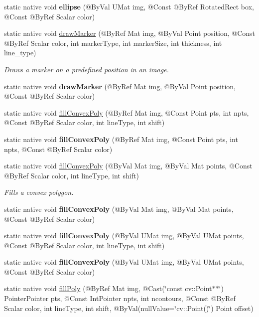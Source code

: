 \begin{DoxyCompactItemize}
\item 
static native void {\bfseries ellipse} (@By\+Val U\+Mat img, @Const @By\+Ref Rotated\+Rect box, @Const @By\+Ref Scalar color)
\item 
static native void \hyperlink{group__imgproc__draw_gaedc7348c70c6b2c486689107ee346af3}{draw\+Marker} (@By\+Ref Mat img, @By\+Val Point position, @Const @By\+Ref Scalar color, int marker\+Type, int marker\+Size, int thickness, int line\+\_\+type)
\begin{DoxyCompactList}\small\item\em Draws a marker on a predefined position in an image. \end{DoxyCompactList}\item 
static native void {\bfseries draw\+Marker} (@By\+Ref Mat img, @By\+Val Point position, @Const @By\+Ref Scalar color)
\item 
static native void \hyperlink{group__imgproc__draw_ga825cdf4013e0a71e60022826a5d47037}{fill\+Convex\+Poly} (@By\+Ref Mat img, @Const Point pts, int npts, @Const @By\+Ref Scalar color, int line\+Type, int shift)
\item 
static native void {\bfseries fill\+Convex\+Poly} (@By\+Ref Mat img, @Const Point pts, int npts, @Const @By\+Ref Scalar color)
\item 
static native void \hyperlink{group__imgproc__draw_gadde734279c0c012260b7bf8a33f44fff}{fill\+Convex\+Poly} (@By\+Val Mat img, @By\+Val Mat points, @Const @By\+Ref Scalar color, int line\+Type, int shift)
\begin{DoxyCompactList}\small\item\em Fills a convex polygon. \end{DoxyCompactList}\item 
static native void {\bfseries fill\+Convex\+Poly} (@By\+Val Mat img, @By\+Val Mat points, @Const @By\+Ref Scalar color)
\item 
static native void {\bfseries fill\+Convex\+Poly} (@By\+Val U\+Mat img, @By\+Val U\+Mat points, @Const @By\+Ref Scalar color, int line\+Type, int shift)
\item 
static native void {\bfseries fill\+Convex\+Poly} (@By\+Val U\+Mat img, @By\+Val U\+Mat points, @Const @By\+Ref Scalar color)
\item 
static native void \hyperlink{group__imgproc__draw_ga885773572ec9b1e9c138b4656851a82a}{fill\+Poly} (@By\+Ref Mat img, @Cast(\char`\"{}const cv\+::\+Point$\ast$$\ast$\char`\"{}) Pointer\+Pointer pts, @Const Int\+Pointer npts, int ncontours, @Const @By\+Ref Scalar color, int line\+Type, int shift, @By\+Val(null\+Value=\char`\"{}cv\+::\+Point()\char`\"{}) Point offset)
$$
\end{DoxyCompactItemize}
